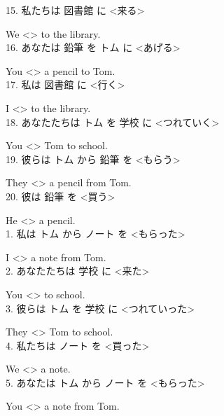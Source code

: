 \documentclass[uplatex,
paper=a4,
fontsize=18pt,
jafontsize=16pt,
number_of_lines=30,
line_length=30zh,
baselineskip=25pt,
]{jlreq}
\begin{document}
15.  私たちは 図書館 に <来る>

  We <\hspace{3em}> to the library.
\\

16.  あなたは 鉛筆 を トム に <あげる>

  You <\hspace{3em}> a pencil to Tom.
\\

17.  私は 図書館 に <行く>

  I <\hspace{3em}> to the library.
\\

18.  あなたたちは トム を 学校 に <つれていく>

  You <\hspace{3em}> Tom to school.
\\

19.  彼らは トム から 鉛筆 を <もらう>

  They <\hspace{3em}> a pencil from Tom.
\\

20.  彼は 鉛筆 を <買う>

  He <\hspace{3em}> a pencil.
\\


\newpage
{}
1.  私は トム から ノート を <もらった>

  I <\hspace{3em}> a note from Tom.
\\

2.  あなたたちは 学校 に <来た>

  You <\hspace{3em}> to school.
\\

3.  彼らは トム を 学校 に <つれていった>

  They <\hspace{3em}> Tom to school.
\\

4.  私たちは ノート を <買った>

  We <\hspace{3em}> a note.
\\

5.  あなたは トム から ノート を <もらった>

  You <\hspace{3em}> a note from Tom.
\\
\end{document}
